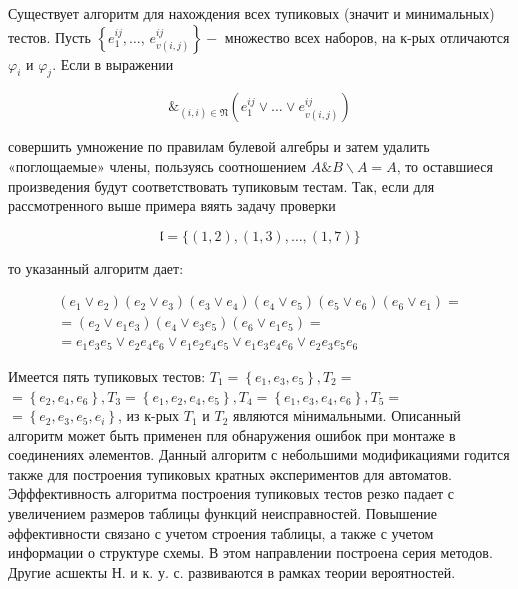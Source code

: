 \documentclass[10pt]{article}
\begin{document}
Существует алгоритм для нахождения всех тупиковых (значит и минимальных) тестов. Пусть $\left\{e_{1}^{i j}, \ldots\right.$, $\left.e_{v(i, j)}^{i j}\right\}-$ множество всех наборов, на к-рых отличаются $\varphi_{i}$ и $\varphi_{j}$. Если в выражении



\[

\&_{(i, i) \in \mathfrak{N}}\left(e_{1}^{i j} \vee \ldots \vee e_{v(i, j)}^{i j}\right)

\]



совершить умножение по правилам булевой алгебры и затем удалить «поглощаемые» члены, пользуясь соотношением $A \& B \backslash A=A$, то оставшиеся произведения будут соответствовать тупиковым тестам. Так, если для рассмотренного выше примера вяять задачу проверки



\[

\mathfrak{l}=\{(1,2),(1,3), \ldots,(1,7)\}

\]



то указанный алгоритм дает:



\[

\begin{gathered}

\left(e_{1} \vee e_{2}\right)\left(e_{2} \vee e_{3}\right)\left(e_{3} \vee e_{4}\right)\left(e_{4} \vee e_{5}\right)\left(e_{5} \vee e_{6}\right)\left(e_{6} \vee e_{1}\right)= \\

=\left(e_{2} \vee e_{1} e_{3}\right)\left(e_{4} \vee e_{3} e_{5}\right)\left(e_{6} \vee e_{1} e_{5}\right)= \\

=e_{1} e_{3} e_{5} \vee e_{2} e_{4} e_{6} \vee e_{1} e_{2} e_{4} e_{5} \vee e_{1} e_{3} e_{4} e_{6} \vee e_{2} e_{3} e_{5} e_{6}

\end{gathered}

\]



Имеется пять тупиковых тестов: $T_{1}=\left\{e_{1}, e_{3}, e_{5}\right\}, T_{2}=$ $=\left\{e_{2}, e_{4}, e_{6}\right\}, T_{3}=\left\{e_{1}, e_{2}, e_{4}, e_{5}\right\}, T_{4}=\left\{e_{1}, e_{3}, e_{4}, e_{6}\right\}, T_{5}=$ $=\left\{e_{2}, e_{3}, e_{5}, e_{i}\right\}$, из к-рых $T_{1}$ и $T_{2}$ являются мінимальными. Описанный алгоритм может быть применен пля обнаружения ошибок при монтаже в соединениях әлементов. Данный алгоритм с небольшими модификациями годится также для построения тупиковых кратных әкспериментов для автоматов. Эфффективность алгоритма построения тупиковых тестов резко падает с увеличением размеров таблицы функций неисправностей. Повышение әффективности связано с учетом строения таблицы, а также с учетом информации о структуре схемы. В этом направлении построена серия методов. Другие асшекты Н. и к. у. с. развиваются в рамках теории вероятностей.
\end{document}
